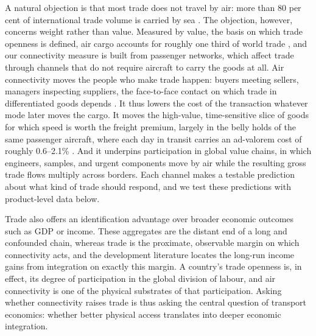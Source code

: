 A natural objection is that most trade does not travel by air: more than 80 per cent of international trade volume is carried by sea \citep{UNCTAD_2021}. The objection, however, concerns weight rather than value. Measured by value, the basis on which trade openness is defined, air cargo accounts for roughly one third of world trade \citep{IATA_cargo}, and our connectivity measure is built from passenger networks, which affect trade through channels that do not require aircraft to carry the goods at all. Air connectivity moves the people who make trade happen: buyers meeting sellers, managers inspecting suppliers, the face-to-face contact on which trade in differentiated goods depends \citep{Rauch_1999,Cristea_2011,Startz_2016}. It thus lowers the cost of the transaction whatever mode later moves the cargo. It moves the high-value,
time-sensitive slice of goods for which speed is worth the freight premium, largely in the belly holds of the same passenger aircraft, where each day in transit carries an ad-valorem cost of roughly 0.6--2.1\%
\citep{Hummels_2007,Hummels_2013}. And it underpins participation in global value chains, in which engineers, samples, and urgent components move by air while the resulting gross trade flows multiply across borders.
Each channel makes a testable prediction about what kind of trade should respond, and we test these predictions with product-level data below.

Trade also offers an identification advantage over broader economic outcomes such as GDP or income. These aggregates are the distant end of a long and confounded chain, whereas trade is the proximate, observable
margin on which connectivity acts, and the development literature locates the long-run income gains from integration on exactly this margin. A country's trade openness is, in effect, its degree of participation in the global division of labour, and air connectivity is one of the physical substrates of that participation. Asking
whether connectivity raises trade is thus asking the central question of transport economics: whether better physical access translates into deeper economic integration.

